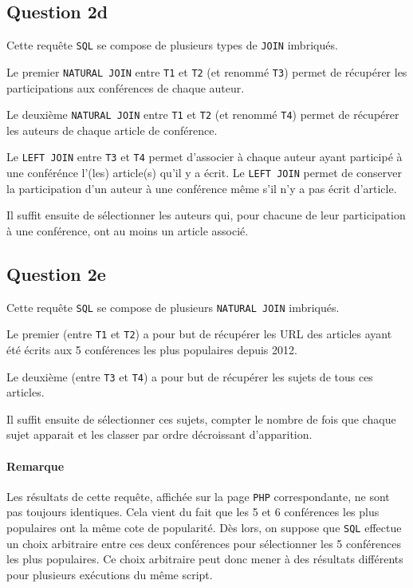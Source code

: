 \documentclass[a4paper, 12pt]{article}
\begin{document}
	\subsection{Question 2d}
	Cette requête \texttt{SQL} se compose de plusieurs types de \texttt{JOIN} imbriqués.\par
	Le premier \texttt{NATURAL JOIN} entre \texttt{T1} et \texttt{T2} (et renommé \texttt{T3}) permet de récupérer les participations aux conférences de chaque auteur.\par
	Le deuxième \texttt{NATURAL JOIN} entre \texttt{T1} et \texttt{T2} (et renommé \texttt{T4}) permet de récupérer les auteurs de chaque article de conférence.\par
	Le \texttt{LEFT JOIN} entre \texttt{T3} et \texttt{T4} permet d'associer à chaque auteur ayant participé à une conférénce l'(les) article(s) qu'il y a écrit. Le \texttt{LEFT JOIN} permet de conserver la participation d'un auteur à une conférence même s'il n'y a pas écrit d'article.\par
	Il suffit ensuite de sélectionner les auteurs qui, pour chacune de leur participation à une conférence, ont au moins un article associé.
	
	\subsection{Question 2e}
	Cette requête \texttt{SQL} se compose de plusieurs \texttt{NATURAL JOIN} imbriqués.\par
	Le premier (entre \texttt{T1} et \texttt{T2}) a pour but de récupérer les URL des articles ayant été écrits aux 5 conférences les plus populaires depuis 2012.\par
	Le deuxième (entre \texttt{T3} et \texttt{T4}) a pour but de récupérer les sujets de tous ces articles.\par
	Il suffit ensuite de sélectionner ces sujets, compter le nombre de fois que chaque sujet apparait et les classer par ordre décroissant d'apparition.
	\paragraph{Remarque} Les résultats de cette requête, affichée sur la page \texttt{PHP} correspondante, ne sont pas toujours identiques. Cela vient du fait que les 5\ieme{} et 6\ieme{} conférences les plus populaires ont la même cote de popularité. Dès lors, on suppose que \texttt{SQL} effectue un choix arbitraire entre ces deux conférences pour sélectionner les 5 conférences les plus populaires. Ce choix arbitraire peut donc mener à des résultats différents pour plusieurs exécutions du même script.
	
\end{document}

